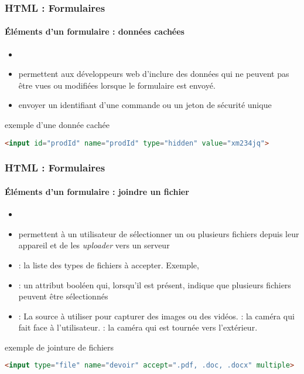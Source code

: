 \documentclass[xcolor=table]{beamer}
\begin{document}
\begin{frame}[fragile]
\frametitle{HTML : Formulaires}
\framesubtitle{Éléments d'un formulaire : données cachées}

\begin{itemize}
	\item {}
	\item permettent aux développeurs web d'inclure des données qui ne peuvent pas être vues ou modifiées lorsque le formulaire est envoyé. 
	\item envoyer un identifiant d'une commande ou un jeton de sécurité unique  
\end{itemize}

\begin{exampleblock}{exemple d'une donnée cachée}
\lstset{escapeinside=**}
\scriptsize\bfseries\vspace{-6pt}
\begin{lstlisting}[language={html}]
<input id="prodId" name="prodId" type="hidden" value="xm234jq">
\end{lstlisting}\vspace{-6pt}
\end{exampleblock}

\end{frame}

\begin{frame}[fragile]
\frametitle{HTML : Formulaires}
\framesubtitle{Éléments d'un formulaire : joindre un fichier}

\begin{itemize}
	\item {}
	\item permettent à un utilisateur de sélectionner un ou plusieurs fichiers depuis leur appareil et de les \textit{uploader} vers un serveur 
	\item {} : la liste des types de fichiers à accepter. Exemple, 
	\item {} : un attribut booléen qui, lorsqu'il est présent, indique que plusieurs fichiers peuvent être sélectionnés
	\item {} : La source à utiliser pour capturer des images ou des vidéos. 
	 : la caméra qui fait face à l'utilisateur. 
	 : la caméra qui est tournée vers l'extérieur. 
\end{itemize}

\begin{exampleblock}{exemple de jointure de fichiers}
\lstset{escapeinside=**}
\scriptsize\bfseries\vspace{-6pt}
\begin{lstlisting}[language={html}]
<input type="file" name="devoir" accept=".pdf, .doc, .docx" multiple>
\end{lstlisting}\vspace{-6pt}
\end{exampleblock}

\end{frame}
\end{document}
